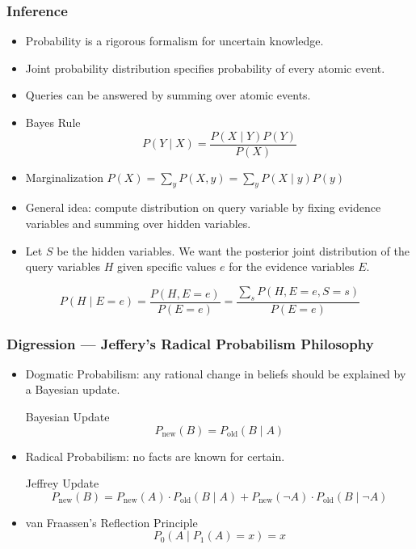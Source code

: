 \documentclass[UTF8,11pt,colorlinks,compress,openany]{beamer}%
\begin{document}
\begin{frame}\frametitle{Inference}
\begin{itemize}
	\item Probability is a rigorous formalism for uncertain knowledge.
	\item Joint probability distribution specifies probability of every atomic event.
	\item Queries can be answered by summing over atomic events.
\end{itemize}
\begin{itemize}
	\item Bayes Rule
	\[P(Y\mid X)=\frac{P(X\mid Y)P(Y)}{P(X)}\]
	\item Marginalization $P(X)=\sum\limits_y P(X,y)=\sum\limits_y P(X\mid y)P(y)$
	\item General idea: compute distribution on query variable by fixing evidence variables and summing over hidden variables.
	\item Let $S$ be the hidden variables. We want the posterior joint distribution of the query variables $H$ given specific values $e$ for the evidence variables $E$.
\end{itemize}
\[P(H\mid E=e)=\frac{P(H,E=e)}{P(E=e)}=\frac{\sum\limits_{s}P(H,E=e,S=s)}{P(E=e)}\]
\end{frame}

\begin{frame}\frametitle{Digression --- Jeffery's Radical Probabilism Philosophy}
\centerline{}
\begin{itemize}
\item Dogmatic Probabilism: any rational change in beliefs should be explained by a Bayesian update.
\begin{block}{Bayesian Update}
\[P_{\mathrm{new}}(B)=P_{\mathrm{old}}(B\mid A)\]
\end{block}
\item Radical Probabilism: no facts are known for certain.
\begin{block}{Jeffrey Update}
\[P_{\mathrm{new}}(B)=P_{\mathrm{new}}(A)\cdot P_{\mathrm{old}}(B\mid A)+P_{\mathrm{new}}(\neg A)\cdot P_{\mathrm{old}}(B\mid \neg A)\]
\end{block}
\item van Fraassen's Reflection Principle
\[P_0(A\mid P_1(A)=x)=x\]
\end{itemize}
\end{frame}
\end{document}
